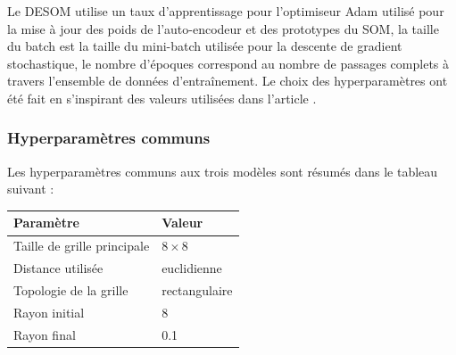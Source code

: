 \documentclass[12pt,a4paper]{report}
\begin{document}
Le DESOM utilise un taux d'apprentissage pour l'optimiseur Adam utilisé pour la mise à jour des poids de l'auto-encodeur et des prototypes du SOM, 
la taille du batch est la taille du mini-batch utilisée pour la descente de gradient stochastique, le nombre d'époques correspond au nombre de passages complets 
à travers l'ensemble de données d'entraînement. Le choix des hyperparamètres ont été fait
en s'inspirant des valeurs utilisées dans l'article \cite{DESOM}.

\subsubsection{Hyperparamètres communs}
Les hyperparamètres communs aux trois modèles sont résumés dans le tableau suivant :

\begin{center}
\begin{tabular}{ll}
\toprule
Paramètre & Valeur \\
\midrule
Taille de grille principale & $8 \times 8$ \\
Distance utilisée & euclidienne \\
Topologie de la grille & rectangulaire \\
Rayon initial & 8 \\
Rayon final & 0.1 \\
\bottomrule
\end{tabular}
\end{center}
\end{document}
